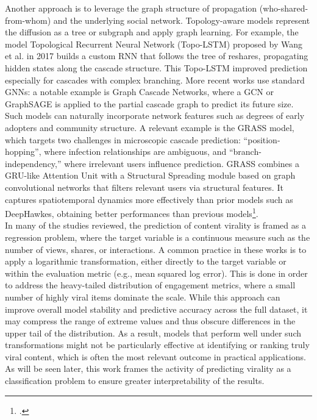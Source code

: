 \documentclass[a4paper,twoside,12pt]{book}
\begin{document}
	Another approach is to leverage the graph structure of propagation (who-shared-from-whom) and the underlying social network. Topology-aware models represent the diffusion as a tree or subgraph and apply graph learning. For example, the model Topological Recurrent Neural Network (Topo-LSTM) proposed by Wang et al. in 2017 builds a custom RNN that follows the tree of reshares, propagating hidden states along the cascade structure. This Topo-LSTM improved prediction especially for cascades with complex branching. More recent works use standard GNNs: a notable example is Graph Cascade Networks, where a GCN or GraphSAGE is applied to the partial cascade graph to predict its future size. Such models can naturally incorporate network features such as degrees of early adopters and community structure. A relevant example is the GRASS model, which targets two challenges in microscopic cascade prediction: “position-hopping”, where infection relationships are ambiguous, and “branch-independency,” where irrelevant users influence prediction. GRASS combines a GRU-like Attention Unit with a Structural Spreading module based on graph convolutional networks that filters relevant users via structural features. It captures spatiotemporal dynamics more effectively than prior models such as DeepHawkes, obtaining better performances than previous models\footcite{li2024}. \\
	
	In many of the studies reviewed, the prediction of content virality is framed as a regression problem, where the target variable is a continuous measure such as the number of views, shares, or interactions. A common practice in these works is to apply a logarithmic transformation, either directly to the target variable or within the evaluation metric (e.g., mean squared log error). This is done in order to address the heavy-tailed distribution of engagement metrics, where a small number of highly viral items dominate the scale. While this approach can improve overall model stability and predictive accuracy across the full dataset, it may compress the range of extreme values and thus obscure differences in the upper tail of the distribution. As a result, models that perform well under such transformations might not be particularly effective at identifying or ranking truly viral content, which is often the most relevant outcome in practical applications. As will be seen later, this work frames the activity of predicting virality as a classification problem to ensure greater interpretability of the results.
	
\end{document}
